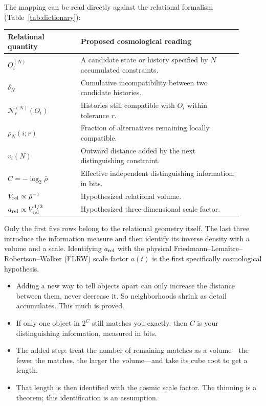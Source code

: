 \documentclass[10pt]{article}
\newenvironment{persuasions}
  {\begin{cpbox}\small\setlength{\parskip}{0pt}%
   {\footnotesize\bfseries\color{accent}%
    \textls[110]{CONCEPTUAL PERSUASIONS}}\par\vspace{3pt}%
   \begin{itemize}[leftmargin=1.15em,itemsep=2.5pt,topsep=0pt,parsep=0pt,
                   label=\textcolor{accent}{\scriptsize$\blacktriangleright$}]}
  {\end{itemize}\end{cpbox}}
\begin{document}
The mapping can be read directly against the relational formalism
(Table~\ref{tab:dictionary}):
\begin{center}
\label{tab:dictionary}
\small
\begin{tabular}{>{\raggedright\arraybackslash}p{0.29\linewidth}
                >{\raggedright\arraybackslash}p{0.62\linewidth}}
\toprule
Relational quantity & Proposed cosmological reading\\
\midrule
$O_i^{(N)}$ & A candidate state or history specified by $N$ accumulated constraints.\\
$\delta_N$ & Cumulative incompatibility between two candidate histories.\\
$\mathcal N_r^{(N)}(O_i)$ & Histories still compatible with $O_i$ within tolerance $r$.\\
$\rho_N(i;r)$ & Fraction of alternatives remaining locally compatible.\\
$v_i(N)$ & Outward distance added by the next distinguishing constraint.\\
$C=-\log_2\bar\rho$ & Effective independent distinguishing information, in bits.\\
$V_{\rm rel}\propto\bar\rho^{-1}$ & Hypothesized relational volume.\\
$a_{\rm rel}\propto V_{\rm rel}^{1/3}$ & Hypothesized three-dimensional scale factor.\\
\bottomrule
\end{tabular}
\end{center}
Only the first five rows belong to the relational geometry itself.  The last
three introduce the information measure and then identify its inverse density
with a volume and a scale.  Identifying $a_{\rm rel}$ with the physical
Friedmann--Lema\^itre--Robertson--Walker (FLRW) scale factor $a(t)$ is the first
specifically cosmological hypothesis.

\begin{persuasions}
\item Adding a new way to tell objects apart can only increase the distance
between them, never decrease it.  So neighborhoods shrink as detail
accumulates.  This much is proved.
\item If only one object in $2^C$ still matches you exactly, then $C$ is your
distinguishing information, measured in bits.
\item The added step: treat the number of remaining matches as a volume---the
fewer the matches, the larger the volume---and take its cube root to get a
length.
\item That length is then identified with the cosmic scale factor.  The
thinning is a theorem; this identification is an assumption.
\end{persuasions}
\end{document}
